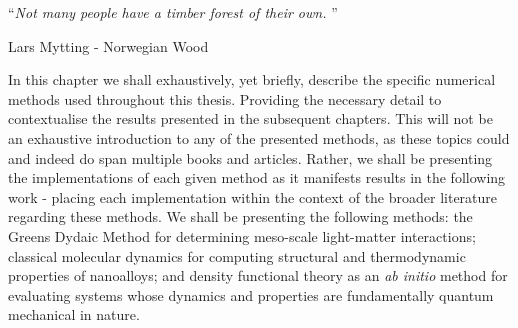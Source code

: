 \noindent\enquote{\itshape Not many people have a timber forest of their own.  }\bigbreak

\hfill Lars Mytting - Norwegian Wood 

\vspace*{0.05\textheight}

In this chapter we shall exhaustively, yet briefly, describe the specific numerical methods used throughout this thesis. Providing the necessary detail to contextualise the results presented in the subsequent chapters. This will not be an exhaustive introduction to any of the presented methods, as these topics could and indeed do span multiple books and articles. Rather, we shall be presenting the implementations of each given method as it manifests results in the following work - placing each implementation within the context of the broader literature regarding these methods. We shall be presenting the following methods: the Greens Dydaic Method for determining meso-scale light-matter interactions; classical molecular dynamics for computing structural and thermodynamic properties of nanoalloys; and density functional theory as an \textit{ab initio} method for evaluating systems whose dynamics and properties are fundamentally quantum mechanical in nature.

